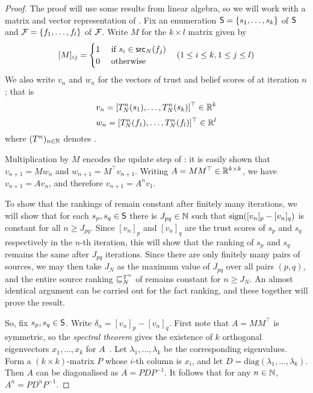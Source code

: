\begin{proof}
    The proof will use some results from linear algebra, so we will work with a
    matrix and vector representation of \usums{}. Fix an enumeration $\S =
    \{s_1,\ldots,s_k\}$ of $\S$ and $\F = \{f_1,\ldots,f_l\}$ of $\F$. Write
    $M$ for the $k \times l$ matrix given by
    \[
        [M]_{ij} = \begin{cases}
            1 & \text{ if } s_i \in \src_N(f_j) \\
            0 & \text{ otherwise }
        \end{cases}
        \quad
        (1 \le i \le k, 1 \le j \le l)
    \]
    We also write $v_n$ and $w_n$ for the vectors of trust and belief scores of
    \usums{} at iteration $n$; that is
    \[
        v_n = [T_N^n(s_1), \ldots, T_N^n(s_k)]^\top \in \R^k
    \]
    \[
        w_n = [T_N^n(f_1), \ldots, T_N^n(f_l)]^\top \in \R^l
    \]
    where $(T^n)_{n \in \Nat}$ denotes \usums{}.

    Multiplication by $M$ encodes the update step of \usums{}: it is easily
    shown that $v_{n+1} = Mw_n$ and $w_{n+1} = M^{\top}v_{n+1}$.  Writing $A =
    MM^\top \in \R^{k \times k}$, we have $v_{n+1} = Av_n$, and therefore
    $v_{n+1} = A^n v_1$.

    To show that the rankings of \usums{} remain constant after finitely many
    iterations, we will show that for each $s_p, s_q \in \S$ there is $J_{pq}
    \in \Nat$ such that $\sign([v_n]_p - [v_n]_q)$ is constant for all $n \ge
    J_{pq}$. Since $[v_n]_p$ and $[v_n]_q$ are the trust scores of $s_p$ and
    $s_q$ respectively in the $n$-th iteration, this will show that the ranking
    of $s_p$ and $s_q$ remains the same after $J_{pq}$ iterations. Since there
    are only finitely many pairs of sources, we may then take $J_N$ as the
    maximum value of $J_{pq}$ over all pairs $(p, q)$, and the entire source
    ranking ${\sle_N^{T^n}}$ of \usums{} remains constant for $n \ge J_N$. An
    almost identical argument can be carried out for the fact ranking, and
    these together will prove the result.

    So, fix $s_p, s_q \in \S$. Write $\delta_n = [v_n]_p - [v_n]_q$. First note
    that $A = MM^\top$ is symmetric, so the \emph{spectral theorem} gives the
    existence of $k$ orthogonal eigenvectors $x_1, \ldots, x_k$ for
    $A$~\cite[Theorem 7.29]{axler2014}. Let $\lambda_1, \ldots, \lambda_k$ be
    the corresponding eigenvalues. Form a $(k \times k)$-matrix $P$ whose
    $i$-th column is $x_i$, and let $D =
    \text{diag}(\lambda_1,\ldots,\lambda_k)$. Then $A$ can be diagonalised as
    $A = PDP^{-1}$. It follows that for any $n \in \Nat$, $A^n = PD^nP^{-1}$.


\end{proof}
